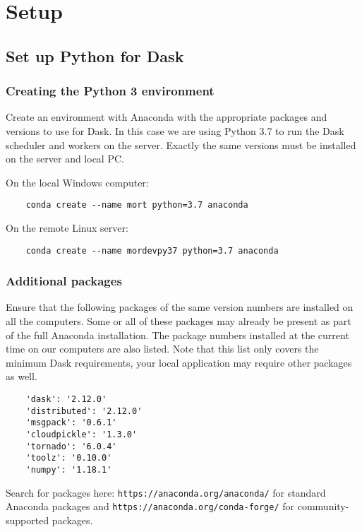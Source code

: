 
\chapter{\libraddask{} Setup}
\label{chap:libraddaskSetup}

\section{Set up Python for Dask}

\subsection{Creating the Python 3 environment}

Create an environment with Anaconda with the appropriate packages and versions to use for Dask.
In this case we are using Python 3.7 to run the Dask scheduler and workers on the server.
Exactly the same versions must be installed on the server and local PC.

On the local Windows computer:
\begin{lstlisting}
    conda create --name mort python=3.7 anaconda
\end{lstlisting}

On the remote Linux server:
\begin{lstlisting}
    conda create --name mordevpy37 python=3.7 anaconda
\end{lstlisting}


\subsection{Additional packages}
\label{sec:Additionalpackages}

Ensure that the following packages of the same version numbers are installed on all the computers. 
Some or all of these packages may already be present as part of the full Anaconda installation.
The package numbers installed at the current time on our computers are also listed.
Note that this list only covers the minimum Dask requirements, your local application may require other packages as well.
\begin{lstlisting}
    'dask': '2.12.0'
    'distributed': '2.12.0'
    'msgpack': '0.6.1'
    'cloudpickle': '1.3.0'
    'tornado': '6.0.4'
    'toolz': '0.10.0'
    'numpy': '1.18.1'
\end{lstlisting}

Search for packages here: 
\lstinline{https://anaconda.org/anaconda/} for standard Anaconda packages and 
\lstinline{https://anaconda.org/conda-forge/} for community-supported packages.

